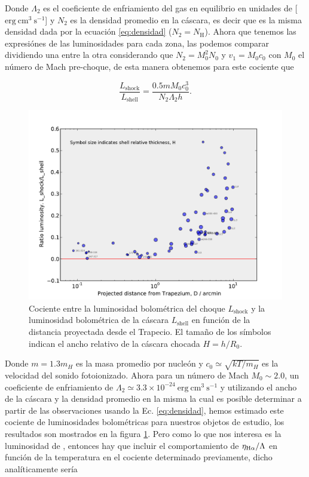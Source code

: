 Donde \(\Lambda_{2}\) es el coeficiente de enfriamiento del gas en equilibrio en unidades de [\(\mathrm{erg~cm^{3}~s^{-1}}\)] y \(N_{2}\) es la densidad promedio en la cáscara, es decir que es la misma densidad dada por la ecuación \ref{eq:densidad} (\(N_{2} = N_{\text{H}}\)). Ahora que tenemos las expresiónes de las luminosidades para cada zona, las podemos comparar dividiendo una entre la otra considerando que \(N_{2} = M^{2}_{0} N_{0}\) y \(v_{1} = M_{0} c_{0}\) con \(M_{0}\) el número de Mach pre-choque, de esta manera obtenemos para este cociente que

\begin{equation}
  \label{eq:ratio}
  \frac{L_{\text{shock}}}{L_{\text{shell}}} = \frac{0.5 m M_{0} c_{0}^{3}}{N_{2}  \Lambda_{2} h}.
\end{equation}

\begin{figure}
  \centering
  \includegraphics[width=.95\linewidth, clip]{luis-programas/luminosity-ratio}
  \caption{Cociente entre la luminosidad bolométrica del choque \(L_{\text{shock}}\) y la luminosidad bolométrica de la cáscara \(L_{\text{shell}}\) en función de la distancia proyectada desde el Trapecio. El tamaño de los símbolos indican el ancho relativo de la cáscara chocada \(H=h/R_{0}\).}
  \label{fig:ratio-lumi}
\end{figure}

Donde \(m=1.3m_{H}\) es la masa promedio por nucleón y \(c_{0} \simeq \sqrt{kT/m_{H}}\) es la velocidad del sonido fotoionizado. Ahora para un número de Mach \(M_{0} \sim 2.0\), un  coeficiente de enfriamiento de  \(\Lambda_{2} \simeq 3.3\times10^{-24}~\mathrm{erg~cm^{3}~s^{-1}}\) \citep{Osterbrock:2006} y utilizando el ancho de la cáscara y la densidad promedio en la misma la cual es posible determinar a partir de las observaciones usando la Ec. \ref{eq:densidad}, hemos estimado este cociente  de luminosidades bolométricas para nuestros objetos de estudio, los resultados son mostrados en la figura \ref{fig:ratio-lumi}. Pero como lo que nos interesa es la luminosidad de \ha{}, entonces hay que incluir el comportamiento de \(\eta_{\mathrm{H}\alpha{}}/\Lambda\) en función de la temperatura en el cociente determinado previamente, dicho analíticamente sería

